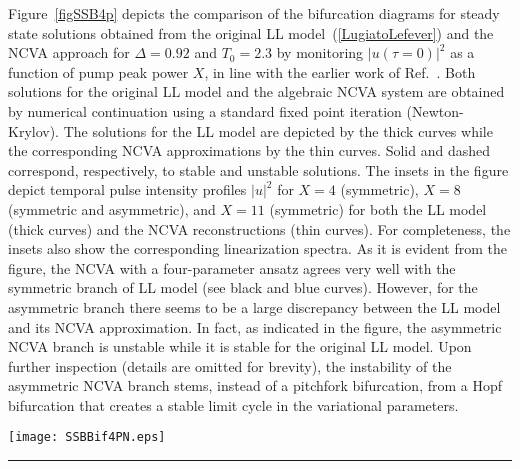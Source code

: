 Figure~\ref{figSSB4p} depicts the comparison of the bifurcation diagrams
for steady state solutions obtained from the original LL 
model~(\ref{LugiatoLefever}) and the NCVA approach for $\Delta =0.92$ 
and $T_0=2.3$ by monitoring $|u (\tau=0)|^2$ as a function of pump 
peak power $X$, in line with the earlier work of Ref.~\cite{XuCoen}.
%
Both solutions for the original LL model and the algebraic NCVA system
are obtained by numerical continuation using a standard fixed point iteration 
(Newton-Krylov).
%
The solutions for the LL model are depicted by the thick curves
while the corresponding NCVA approximations by the thin curves.
Solid and dashed correspond, respectively, to stable and unstable 
solutions.
%
The insets in the figure depict temporal pulse intensity profiles 
$|u|^2$ for $X = 4$ (symmetric), $X=8$ (symmetric and asymmetric), 
and $X=11$ (symmetric) for both the LL model (thick curves)
and the NCVA reconstructions (thin curves).
%
For completeness, the insets also show the corresponding linearization
spectra.
%
As it is evident from the figure, the NCVA with a four-parameter 
ansatz agrees very well with the symmetric branch of LL model
(see black and blue curves). However, for the asymmetric branch
there seems to be a large discrepancy between the LL model and
its NCVA approximation. In fact, as indicated in the figure, the 
asymmetric NCVA branch is unstable while it is stable for the original 
LL model. Upon further inspection (details are omitted for brevity), 
the instability of the asymmetric NCVA branch stems, instead of
a pitchfork bifurcation, from a Hopf bifurcation that creates a stable 
limit cycle in the variational parameters.
%
\begin{figure*}[t!!]
\centering
\centerline{
\texttt{[image: SSBBif4PN.eps]}}
  \rule{35em}{0.5pt}
\caption[SSB Bifurcation Diagram Comparison for LL Steady States and NCVA 4-Parameter Ansatz]{Bifurcation for steady states of the LL model (\ref{LugiatoLefever})
(thick curves) and their approximation using the NCVA methodology with the 
over-simplified four-parameter ansatz (\ref{eq:4pAnsatz}) (thin curves)
as the pump strength $X$ is varied for $\Delta = 0.92$ and $T_0 = 2.3$.
%
Stable (Unstable) branches are depicted with solid (dashed) lines.
%
The (red and green) branches bifurcating from the main branch (blue and 
black lines) correspond to asymmetric solutions.
%
The insets depict the pulse temporal intensity profiles obtained for 
$X=4, 8$ (symmetric and asymmetric), and $X=11$ (symmetric) for
the original LL model (thick curves) and their NCVA approximation
(thin curves).
%
The insets also depict the corresponding stability spectra
for these solutions where stable eigenvalues are depicted in blue 
and unstable eigenvalues in red.
\label{figSSB4p}}
\end{figure*}

